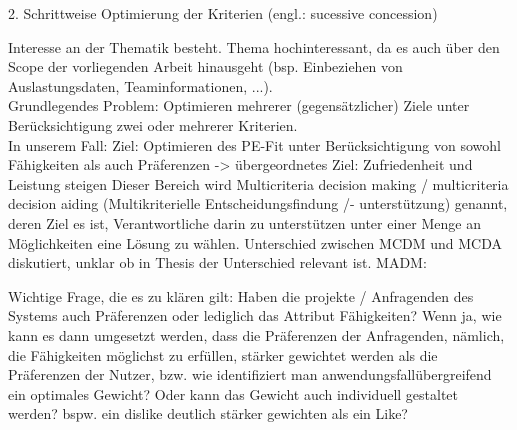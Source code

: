 2. Schrittweise Optimierung der Kriterien (engl.: sucessive concession) %

Interesse an der Thematik besteht. %
Thema hochinteressant, da es auch über den Scope der vorliegenden Arbeit hinausgeht (bsp. Einbeziehen von Auslastungsdaten, Teaminformationen, ...).\\

Grundlegendes Problem: Optimieren mehrerer (gegensätzlicher) Ziele unter Berücksichtigung zwei oder mehrerer Kriterien.\\ %
In unserem Fall: Ziel: Optimieren des PE-Fit unter Berücksichtigung von sowohl Fähigkeiten als auch Präferenzen -> übergeordnetes Ziel: Zufriedenheit und Leistung steigen
Dieser Bereich wird Multicriteria decision making / multicriteria decision aiding (Multikriterielle Entscheidungsfindung /- unterstützung) genannt, deren Ziel es ist, Verantwortliche darin zu unterstützen unter einer Menge an Möglichkeiten eine Lösung zu wählen. Unterschied zwischen MCDM und MCDA diskutiert, unklar ob in Thesis der Unterschied relevant ist. %
MADM: %

Wichtige Frage, die es zu klären gilt: Haben die projekte / Anfragenden des Systems auch Präferenzen oder lediglich das Attribut Fähigkeiten? Wenn ja, wie kann es dann umgesetzt werden, dass die Präferenzen der Anfragenden, nämlich, die Fähigkeiten möglichst zu erfüllen, stärker gewichtet werden als die Präferenzen der Nutzer, bzw. wie identifiziert man anwendungsfallübergreifend ein optimales Gewicht?
Oder kann das Gewicht auch individuell gestaltet werden? bspw. ein dislike deutlich stärker gewichten als ein Like?

